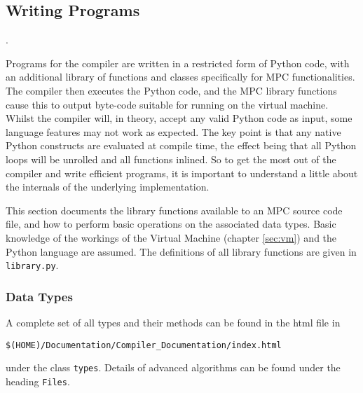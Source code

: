 \label{sec:Mamba}
\subsection{Writing Programs}

.

Programs for the compiler are written in a restricted form of Python code,
with an additional library of functions and classes specifically for MPC
functionalities. The compiler then executes the Python code, and the MPC
library functions cause this to output
byte-code suitable for running on the virtual machine.
Whilst the compiler will, in theory, accept any valid Python
code as input, some language features may not work as expected.
The key point is that any native Python constructs are evaluated at compile
time, the effect being that all Python loops will be unrolled and all functions
inlined.
So to get the most out of the compiler and write efficient programs,
it is important to understand a little about the internals of the underlying implementation.

This section documents the library functions available to an MPC source code
file, and how to perform basic operations on the associated data types.
Basic knowledge of the workings of the Virtual Machine
(chapter \ref{sec:vm}) and the Python language are assumed. The definitions
of all library functions are given in \verb|library.py|.

\subsubsection{Data Types}
\label{ref:datatypes}

A complete set of all types and their methods can be found in
the html file in
\begin{center}
  \verb+$(HOME)/Documentation/Compiler_Documentation/index.html+
\end{center}
under the class \verb+types+.
Details of advanced algorithms can be found under the heading
\verb+Files+.
